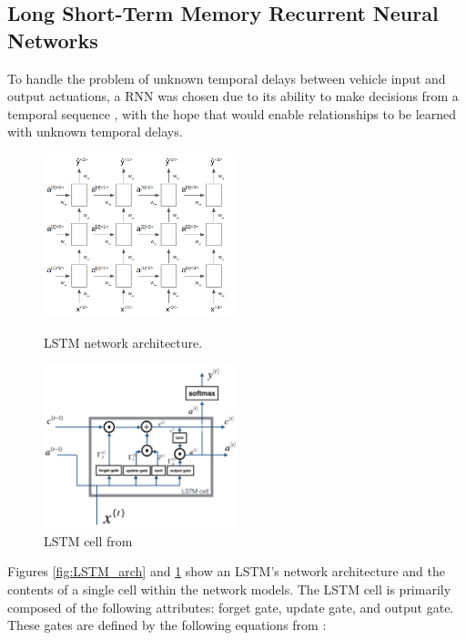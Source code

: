 \documentclass{article}
\begin{document}
\subsection{Long Short-Term Memory Recurrent Neural Networks}

To handle the problem of unknown temporal delays between vehicle input and output actuations, a RNN was chosen due to its ability to make decisions from a temporal sequence \cite{karpathy2015}, with the hope that would enable relationships to be learned with unknown temporal delays.

\begin{figure}[h!]
  \centering
  \begin{minipage}[b]{0.49\textwidth}
    \includegraphics[width=\textwidth, height=4.75cm]{LSTM_arch}
    \caption{LSTM network architecture.}
    \label{fig:LSTM_arch}
  \end{minipage}
  \hfill
  \begin{minipage}[b]{0.49\textwidth}
    \includegraphics[width=\textwidth, height=4.75cm]{LSTM_cell}
    \caption{LSTM cell from \cite{ng_katanforoosh_bensouda_mourri}}
    \label{fig:LSTM_cell}
  \end{minipage}
\end{figure}

Figures \ref{fig:LSTM_arch} and \ref{fig:LSTM_cell} show an LSTM's network architecture and the contents of a single cell within the network models. The LSTM cell is primarily composed of the following attributes: forget gate, update gate, and output gate. These gates are defined by the following equations from \cite{ng_katanforoosh_bensouda_mourri}:
\end{document}
